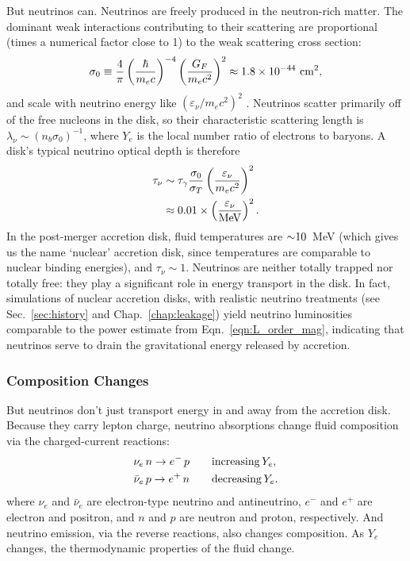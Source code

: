 But neutrinos can. Neutrinos are freely produced in the neutron-rich matter.
The dominant weak interactions contributing to their scattering
are proportional (times a numerical factor close to 1)
to the weak scattering cross section:
\begin{equation}
  \sigma_0
  \equiv \frac{4}{\pi}\left(\frac{\hbar}{m_e c}\right)^{-4}
  \left(\frac{G_F}{m_e c^2}\right)^2
  \approx 1.8 \times 10^{-44} \,\, {\rm cm}^2, \nonumber
\end{equation}
and scale with neutrino energy like $(\varepsilon_\nu/m_e c^2)^2$
\citep{tubb1975-neutrino_opacities,shap1983-bh_wd_ns}.
Neutrinos scatter primarily off of the free nucleons in the disk, so their
characteristic scattering length is $\lambda_\nu\sim(n_b\sigma_0)^{-1}$,
where $Y_e$ is the local number ratio of electrons to baryons.
A disk's typical neutrino optical depth is therefore
\begin{align}
  \tau_\nu
  &\sim \tau_\gamma \frac{\sigma_0}{\sigma_T} \left(\frac{\varepsilon_\nu}{m_e c^2}\right)^2 \nonumber \\
  &\approx 0.01\times\left(\frac{\varepsilon_\nu}{\rm MeV}\right)^2. \nonumber
\end{align}
In the post-merger accretion disk, fluid temperatures are $\mathord{\sim}10$~MeV (which
gives us the name `nuclear' accretion disk, since temperatures are comparable to
nuclear binding energies), and $\tau_\nu\sim1$.
Neutrinos are neither totally trapped nor totally free: they play a
significant role in energy transport in the disk.
In fact, simulations of nuclear accretion disks, with realistic neutrino
treatments (see Sec.~\ref{sec:history} and Chap.~\ref{chap:leakage}) yield neutrino
luminosities comparable to the power estimate from Eqn.~\ref{eqn:L_order_mag},
indicating that neutrinos serve to drain the gravitational energy released by
accretion.

\subsubsection{Composition Changes}
\label{sssc:composition}
But neutrinos don't just transport energy in and away from the accretion disk.
Because they carry lepton charge, neutrino absorptions change fluid composition
via the charged-current reactions:
\begin{align}
  \label{eqn:beta_n_to_p}
  \nu_e \, n \rightarrow e^{-} \, p       & \qquad {\rm increasing}\,Y_e, \\
  \label{eqn:beta_p_to_n}
  \bar{\nu}_e \, p \rightarrow e^{+} \, n & \qquad {\rm decreasing}\,Y_e.
\end{align}
where $\nu_e$ and $\bar{\nu}_e$ are electron-type neutrino and antineutrino,
$e^{-}$ and $e^{+}$ are electron and positron, and $n$ and $p$
are neutron and proton, respectively.
And neutrino emission, via the reverse reactions, also changes composition.
As $Y_e$ changes, the thermodynamic properties of the fluid change.

